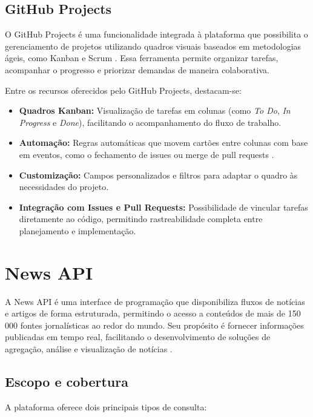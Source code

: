 \subsection{GitHub Projects}
\label{subsec:github-projects}

O GitHub Projects é uma funcionalidade integrada à plataforma que possibilita o gerenciamento de projetos utilizando quadros visuais baseados em metodologias ágeis, como Kanban e Scrum \cite{github_projects}. Essa ferramenta permite organizar tarefas, acompanhar o progresso e priorizar demandas de maneira colaborativa.

Entre os recursos oferecidos pelo GitHub Projects, destacam-se:

\begin{itemize}
\item \textbf{Quadros Kanban:} Visualização de tarefas em colunas (como \textit{To Do}, \textit{In Progress} e \textit{Done}), facilitando o acompanhamento do fluxo de trabalho.
\item \textbf{Automação:} Regras automáticas que movem cartões entre colunas com base em eventos, como o fechamento de issues ou merge de pull requests \cite{github_projects}.
\item \textbf{Customização:} Campos personalizados e filtros para adaptar o quadro às necessidades do projeto.
\item \textbf{Integração com Issues e Pull Requests:} Possibilidade de vincular tarefas diretamente ao código, permitindo rastreabilidade completa entre planejamento e implementação.
\end{itemize}






\section{News API}
\label{sec:news-api}

A News API é uma interface de programação que disponibiliza fluxos de notícias e artigos de forma estruturada, permitindo o acesso a conteúdos de mais de 150\,000 fontes jornalísticas ao redor do mundo. Seu propósito é fornecer informações publicadas em tempo real, facilitando o desenvolvimento de soluções de agregação, análise e visualização de notícias \cite{newsapi_docs}.

\subsection{Escopo e cobertura}
A plataforma oferece dois principais tipos de consulta: 


